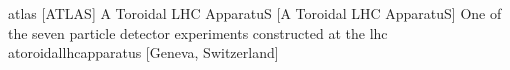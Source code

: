 \newglsXinstitution%
{atlas}%
[ATLAS]%
{A Toroidal LHC ApparatuS}%
[A Toroidal LHC ApparatuS]%
{One of the seven particle detector experiments constructed at the \gls{lhc}}%
{atoroidallhcapparatus}%
[Geneva, Switzerland]%